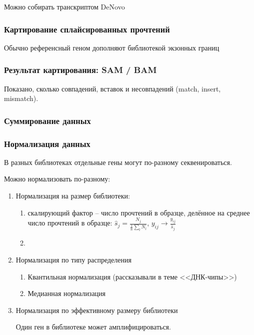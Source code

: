 \documentclass[main.tex]{subfiles}
\begin{document}
Можно собирать транскриптом DeNovo %

\subsubsection{Картирование сплайсированных прочтений}

Обычно референсный геном дополняют библиотекой экзонных границ

\subsubsection{Результат картирования: SAM / BAM}

Показано, сколько совпадений, вставок и несовпадений (match, insert, mismatch).

\subsubsection{Суммирование данных}

\subsubsection{Нормализация данных}

В разных библиотеках отдельные гены могут по-разному секвенироваться.

Можно нормализовать по-разному:
\begin{enumerate}[noitemsep]
 \item Нормализация на размер библиотеки:
 \begin{enumerate}[noitemsep]
     \item скалирующий фактор -- число прочтений в образце, делённое на среднее число прочтений в образце: $ \hat s_j = \frac{N_j}{\frac{1}{n} \sum_l N_l} $, $y_{ij} \to \frac{y_{ij}}{\hat s_j}$
     \item %
 \end{enumerate}

 \item Нормализация по типу распределения
 \begin{enumerate}[noitemsep]
     \item Квантильная нормализация (рассказывали в теме <<ДНК-чипы>>)
     \item Медианная нормализация
 \end{enumerate}
    \item Нормализация по эффективному размеру библиотеки

    Один ген в библиотеке может амплифицироваться.


\end{enumerate}
\end{document}
